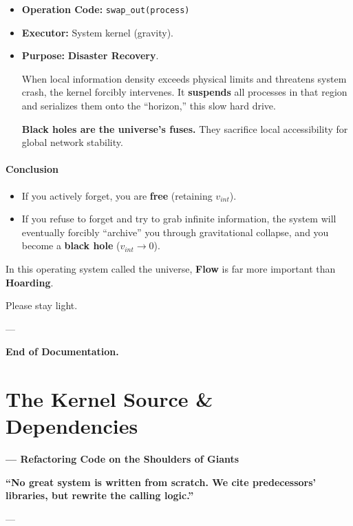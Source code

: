 \documentclass[11pt,a4paper,twoside]{book}
\begin{document}
\begin{itemize}
\item \textbf{Operation Code:} \texttt{swap\_out(process)}

\item \textbf{Executor:} System kernel (gravity).

\item \textbf{Purpose:} \textbf{Disaster Recovery}.

When local information density exceeds physical limits and threatens system crash, the kernel forcibly intervenes. It \textbf{suspends} all processes in that region and serializes them onto the ``horizon,'' this slow hard drive.

\textbf{Black holes are the universe's fuses.} They sacrifice local accessibility for global network stability.
\end{itemize}

\subsubsection{Conclusion}

\begin{itemize}
\item If you actively forget, you are \textbf{free} (retaining $v_{int}$).

\item If you refuse to forget and try to grab infinite information, the system will eventually forcibly ``archive'' you through gravitational collapse, and you become a \textbf{black hole} ($v_{int} \to 0$).
\end{itemize}

In this operating system called the universe, \textbf{Flow} is far more important than \textbf{Hoarding}.

Please stay light.

---

\textbf{End of Documentation.}

\clearpage{}
\clearpage{}\chapter{The Kernel Source \& Dependencies}

\textbf{--- Refactoring Code on the Shoulders of Giants}

\textbf{``No great system is written from scratch. We cite predecessors' libraries, but rewrite the calling logic.''}

---
\end{document}
